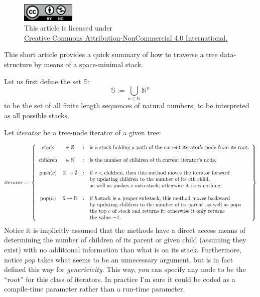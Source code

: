 \documentclass[twoside]{article}
\begin{document}
\begin{figure}[h]
\centering
\includegraphics[width=1in]{../../../cc-by-nc.png}\\[0.1in]
\tiny This article is licensed under \\
\href{http://creativecommons.org/licenses/by-nc/4.0/}
{Creative Commons Attribution-NonCommercial 4.0 International.}\\[0.3in]
\end{figure}

This short article provides a quick summary of how to traverse a tree data-structure by means of a space-minimal stack.

Let us first define the set $ \mathbb{S} $:
$$ \mathbb{S} := \bigcup_{n\in\mathbb{N}}\mathbb{N}^n $$
to be the set of all finite length sequences of natural numbers, to be interpreted as all possible stacks.

Let $ iterator $ be a tree-node iterator of a given tree:

$$ iterator:=
\left\{\begin{array}{cccl}
\mbox{stack}		& \in\mathbb{S}			& : & \mbox{is a stack holding a path of the current iterator's node from its root.} \\
			&				&   & \\
\mbox{children}		& \in\mathbb{N}			& : & \mbox{is the number of children of th current iterator's node.} \\
			&				&   & \\
\mbox{push($ c $)}	& \mathbb{Z}\to\emptyset	& : & \mbox{if $ c < $ children, then this method moves the iterator forward} \\
			&				&   & \mbox{by updating children to the number of its $ c $th child,} \\
			&				&   & \mbox{as well as pushes $ c $ onto stack; otherwise it does nothing.} \\
			&				&   & \\
\mbox{pop($ h $)}	& \mathbb{S}\to\mathbb{N}	& : & \mbox{if $ h $.stack is a proper substack, this method moves backward} \\
			&				&   & \mbox{by updating children to the number of its parent, as well as pops} \\
			&				&   & \mbox{the top $ c $ of stack and returns it; otherwise it only returns} \\
			&				&   & \mbox{the value $ -1 $.}
\end{array}\right\} $$
Notice it is implicitly assumed that the methods have a direct access means of determining the number of children of
its parent or given child (assuming they exist) with no additional information than what is on its stack. Furthermore,
notice $ pop $ takes what seems to be an unnecessary argument, but is in fact defined this way for \emph{genericicity}.
This way, you can specify any node to be the ``root'' for this class of iterators. In practice I'm sure it could be coded
as a compile-time parameter rather than a run-time parameter.
\end{document}
